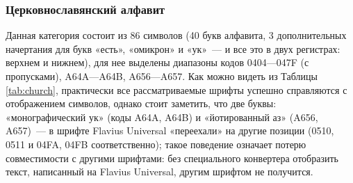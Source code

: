     \subsubsection{Церковнославянский алфавит}
        Данная категория состоит из 86 символов (40 букв алфавита, 3 дополнительных начертания для букв «есть», «омикрон» и «ук»~--- и все это в двух регистрах: верхнем и нижнем), для нее выделены диапазоны кодов 0404—047F (с пропусками), A64A—A64B, A656—A657. Как можно видеть из Таблицы \ref{tab:church}, практически все рассматриваемые шрифты успешно справляются с отображением символов, однако стоит заметить, что две буквы: «монографический ук» (коды A64A, A64B) и «йотированный аз» (A656, A657)~--- в шрифте Flavius Universal «переехали» на другие позиции (0510, 0511 и 04FA, 04FB соответственно); такое поведение означает потерю совместимости с другими шрифтами: без специального конвертера отобразить текст, написанный на Flavius Universal, другим шрифтом не получится.

